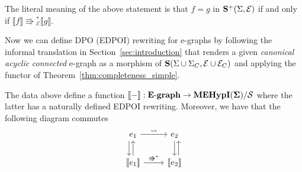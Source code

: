 The literal meaning of the above statement is that $f = g$ in $\mathbf{S}^{+}(\Sigma, \mathcal{E})$ if and only if $\llbracket f \rrbracket \Rrightarrow{}^{*}_{\mathcal{E}} \llbracket g \rrbracket$.

Now we can define DPO (EDPOI) rewriting for e-graphs by following the informal translation in Section~\ref{sec:introduction} that renders a given \textit{canonical} \textit{acyclic} \textit{connected} e-graph as a morphism of $\mathbf{S}(\Sigma \cup \Sigma_{C}, \mathcal{E} \cup \mathcal{E}_{C})$ and applying the functor of Theorem~\ref{thm:completeness_simple}.
\begin{proposition}
The data above define a function $\llbracket - \rrbracket : \mathbf{E}\text{-}\mathbf{graph} \to {\mathbf{MEHypI(\Sigma)}} / \mathcal{S}$ where the latter has a naturally defined EDPOI rewriting.
Moreover, we have that the following diagram commutes
\[
\begin{tikzcd}
		e_1 \arrow[r, "\leadsto"] \arrow[d, shift right=2]                & e_2 \arrow[d]                                        \\
		\llbracket e_1 \rrbracket \arrow[r, "\Rrightarrow^{*}"] \arrow[u] & \llbracket e_{2} \rrbracket \arrow[u, shift right=2]
\end{tikzcd}
\]
\end{proposition}

